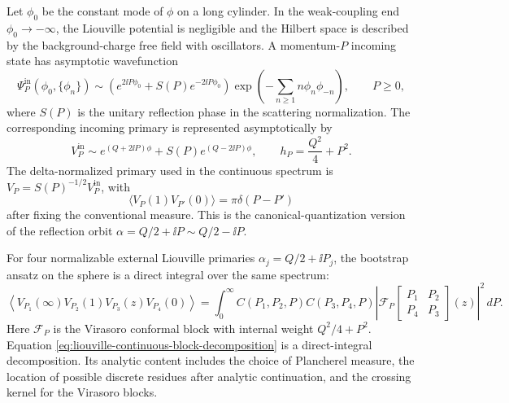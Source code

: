 \begin{definition}
\label{def:liouville-scattering-basis}
Let \(\phi_0\) be the constant mode of \(\phi\) on a long cylinder.  In the
weak-coupling end \(\phi_0\to-\infty\), the Liouville potential is negligible
and the Hilbert space is described by the background-charge free field with
oscillators.  A momentum-\(P\) incoming state has asymptotic wavefunction
\begin{equation}
  \Psi_P^{\mathrm{in}}(\phi_0,\{\phi_n\})
  \sim
  \left(
    e^{2\ii P\phi_0}
    +S(P)e^{-2\ii P\phi_0}
  \right)
  \exp\!\left(-\sum_{n\ge1}n\phi_n\phi_{-n}\right),
  \qquad P\ge0,
  \label{eq:liouville-asymptotic-wavefunction}
\end{equation}
where \(S(P)\) is the unitary reflection phase in the scattering
normalization.  The corresponding incoming primary is represented
asymptotically by
\begin{equation}
  V_P^{\mathrm{in}}
  \sim
  e^{(Q+2\ii P)\phi}
  +S(P)e^{(Q-2\ii P)\phi},
  \qquad
  h_P=\frac{Q^2}{4}+P^2.
  \label{eq:liouville-incoming-primary}
\end{equation}
The delta-normalized primary used in the continuous spectrum is
\(V_P=S(P)^{-1/2}V_P^{\mathrm{in}}\), with
\[
  \langle V_P(1)V_{P'}(0)\rangle=\pi\delta(P-P')
\]
after fixing the conventional measure.  This is the canonical-quantization
version of the reflection orbit \(\alpha=Q/2+\ii P\sim Q/2-\ii P\).
\end{definition}

\begin{definition}
\label{def:liouville-continuous-blocks}
For four normalizable external Liouville primaries
\(\alpha_j=Q/2+\ii P_j\), the bootstrap ansatz on the sphere is a direct
integral over the same spectrum:
\begin{equation}
  \left\langle
    V_{P_1}(\infty)V_{P_2}(1)V_{P_3}(z)V_{P_4}(0)
  \right\rangle
  =
  \int_0^\infty
  C(P_1,P_2,P)C(P_3,P_4,P)
  \left|
    \mathcal F_{P}\!\left[
      \begin{matrix}P_1&P_2\\ P_4&P_3\end{matrix}
    \right](z)
  \right|^2\,dP .
  \label{eq:liouville-continuous-block-decomposition}
\end{equation}
Here \(\mathcal F_P\) is the Virasoro conformal block with internal weight
\(Q^2/4+P^2\).  Equation
\eqref{eq:liouville-continuous-block-decomposition} is a direct-integral
decomposition.  Its analytic content includes the choice of Plancherel
measure, the location of possible discrete residues after analytic
continuation, and the crossing kernel for the Virasoro blocks.
\end{definition}

